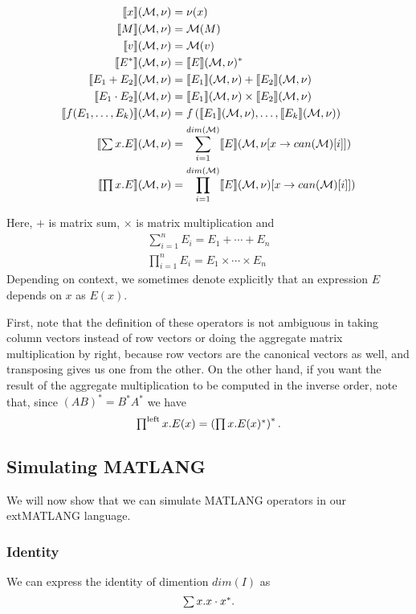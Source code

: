 \begin{align*}
\llbracket x \rrbracket(\mathcal{M},\nu)&=\nu (x)\\
\llbracket M \rrbracket(\mathcal{M},\nu)&=\mathcal{M} (M) \\
\llbracket v \rrbracket(\mathcal{M},\nu)&=\mathcal{M} (v) \\
\llbracket E^* \rrbracket(\mathcal{M},\nu)&=\llbracket E \rrbracket(\mathcal{M},\nu)^* \\
\llbracket E_1+E_2 \rrbracket(\mathcal{M},\nu)&= \llbracket E_1 \rrbracket(\mathcal{M},\nu)+\llbracket E_2 \rrbracket(\mathcal{M},\nu)\\
\llbracket E_1\cdot E_2 \rrbracket(\mathcal{M},\nu)&= \llbracket E_1 \rrbracket(\mathcal{M},\nu)\times \llbracket E_2 \rrbracket(\mathcal{M},\nu)\\
\llbracket f(E_1,\ldots ,E_k) \rrbracket(\mathcal{M},\nu) &= f\left(\llbracket E_1 \rrbracket(\mathcal{M},\nu),\ldots , \llbracket E_k \rrbracket(\mathcal{M},\nu)\right)\\
\llbracket \textstyle\sum x.E \rrbracket(\mathcal{M},\nu)&= \sum_{i=1}^{dim(\mathcal{M})}\llbracket E \rrbracket(\mathcal{M},\nu[x\rightarrow can(\mathcal{M})[i]])\\
\llbracket \textstyle\prod x. E \rrbracket(\mathcal{M},\nu)&= \prod_{i=1}^{dim(\mathcal{M})}\llbracket E \rrbracket(\mathcal{M},\nu)[x\rightarrow can(\mathcal{M})[i]])
\end{align*}

Here, $+$ is matrix sum, $\times$ is matrix multiplication and 
\begin{align*}
\sum_{i=1}^n E_i = E_1+\cdots + E_n \\
\prod_{i=1}^n E_i = E_1\times \cdots\times E_n
\end{align*}
Depending on context, we sometimes denote explicitly that an expression $E$ depends on $x$ as $E(x)$.

First, note that the definition of these operators is not ambiguous in taking column vectors instead of row vectors or doing the aggregate matrix multiplication by right, because row vectors are the canonical vectors as well, and transposing gives us one from the other. On the other hand, if you want the result of the aggregate multiplication to be computed in the inverse order, note that, since $(AB)^*=B^*A^*$ we have $$\textstyle\prod^{\text{left}} x.E(x)=\left(\textstyle\prod x.E(x)^*\right)^*.$$

\subsection{Simulating MATLANG}

We will now show that we can simulate MATLANG operators in our extMATLANG language.

\subsubsection{Identity}

We can express the identity of dimention $dim(I)$ as $$\textstyle\sum x. x\cdot x^*.$$

